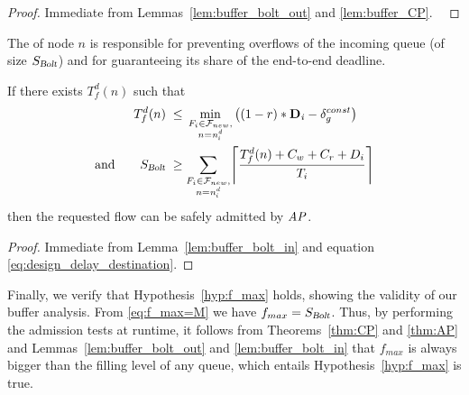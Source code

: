 \begin{proof}Immediate from Lemmas~\ref{lem:buffer_bolt_out} and \ref{lem:buffer_CP}. \
\end{proof}


The \ap of node $n$ is responsible for preventing overflows of the incoming \bolt queue (of size $S_{\textsl{Bolt}}$) and for guaranteeing its share of the end-to-end deadline.

\begin{theorem}
\label{thm:AP}
  If there exists $T_f^d(n)$ such that
  \begin{align*}
    T_f^d(n) \;
    & \leq \, \min_{\substack{F_i\in \mathcal{F}_{new}, \\  n = \flowdsti}}
    \left( (1-r)*\deadlinei - \delta_g^{const} \right)\\
\textup{and}\qquad
    S_{\bolt} \;
    & \geq \sum_{\substack{\flowi \in \mathcal{F}_{new}, \\ n = \flowdsti}} \ceil*{\frac{T_f^d(n) + C_w + C_r + D_i}{T_i}}
  \end{align*}
  then the requested flow \flowj can be safely admitted by $\mathit{AP}$.
\end{theorem}
\begin{proof}
Immediate from Lemma~\ref{lem:buffer_bolt_in} and equation \eqref{eq:design_delay_destination}.
\end{proof}

Finally, we verify that Hypothesis~\ref{hyp:f_max} holds, showing the validity of our buffer analysis. From \eqref{eq:f_max=M} we have $f_{max} = S_{\textsl{Bolt}}$. Thus, by performing the admission tests at runtime, it follows from Theorems~\ref{thm:CP} and \ref{thm:AP} and Lemmas~\ref{lem:buffer_bolt_out} and \ref{lem:buffer_bolt_in} that $f_{max}$ is always bigger than the filling level of any \bolt queue, which entails Hypothesis~\ref{hyp:f_max} is true.
